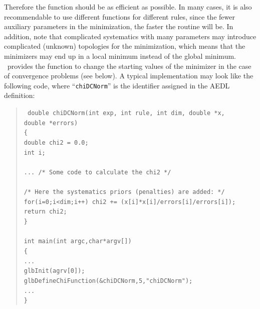 Therefore the function should be as efficient as possible. In many cases, it is also recommendable to use different functions for different rules, since the fewer auxiliary parameters in the minimization, the faster the routine will be. In addition, note that complicated systematics with many parameters may introduce complicated (unknown) topologies for the minimization, which means that the minimizers may
end up in a local minimum instead of the global minimum. \GLOBES\ provides the function  to change the starting values of the minimizer in the case of
 convergence problems (see below).
A typical implementation may look like the following code, where ``{\tt chiDCNorm}'' is the identifier
assigned in the AEDL definition:
\begin{quote}
{\tt
  double chiDCNorm(int exp, int rule, int dim, double *x, \\
  \hspace*{0.5cm} double *errors) \\
  \{ \\
   \hspace*{0.5cm} double chi2 = 0.0; \\
   \hspace*{0.5cm} int i; \\
   \\
   \hspace*{0.5cm} ... /* Some code to calculate the chi2 */ \\
   \\
    \hspace*{0.5cm} /* Here the systematics priors (penalties) are added: */ \\
    \hspace*{0.5cm} for(i=0;i<dim;i++) chi2 += (x[i]*x[i]/errors[i]/errors[i]);
    \hspace*{0.5cm} return chi2; \\
  \} \\
   \\
  int main(int argc,char*argv[]) \\
 \{ \\ 
  \hspace*{0.5cm} ... \\
  \hspace*{0.5cm} glbInit(agrv[0]); \\
  \hspace*{0.5cm} glbDefineChiFunction(\&chiDCNorm,5,"chiDCNorm"); \\
  \hspace*{0.5cm} ... \\
 \} \\
}
\end{quote}
